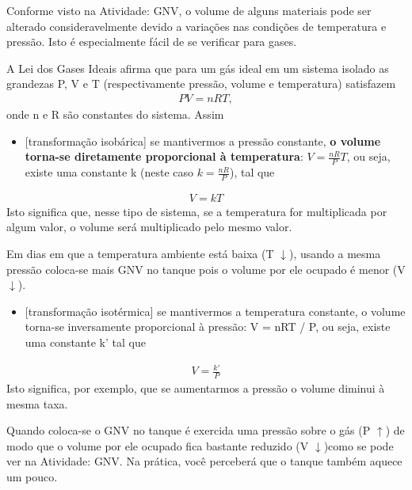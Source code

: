 \begin{reflection}{}

Conforme visto na Atividade: GNV, o volume de alguns materiais pode ser alterado consideravelmente devido a variações nas condições de temperatura e pressão. Isto é especialmente fácil de se verificar para gases.

A Lei dos Gases Ideais afirma que para um gás ideal em um sistema isolado as grandezas P, V e T (respectivamente pressão, volume e temperatura) satisfazem
\begin{equation*}
\begin{split}PV=nRT,\end{split}
\end{equation*}
onde n e R são constantes do sistema. Assim
\begin{itemize}
\item {} 
{[}transformação isobárica{]} se mantivermos a pressão constante, \textbf{o volume torna-se diretamente proporcional à temperatura}: \(V=\frac{nR}{P}T\), ou seja, existe uma constante k (neste caso \(k=\frac{nR}{P}\)), tal que

\end{itemize}
\begin{equation*}
\begin{split}V=kT\end{split}
\end{equation*}
Isto significa que, nesse tipo de sistema, se a temperatura for multiplicada por algum valor, o volume será multiplicado pelo mesmo valor.

Em dias em que a temperatura ambiente está baixa (T \(\downarrow\)), usando a mesma pressão coloca-se mais GNV no tanque pois o volume por ele ocupado é menor (V \(\downarrow\)).
\begin{itemize}
\item {} 
{[}transformação isotérmica{]} se mantivermos a temperatura constante, o volume torna-se inversamente proporcional à pressão: V = nRT / P, ou seja, existe uma constante k’ tal que

\end{itemize}
\begin{equation*}
\begin{split}V=\frac{k'}{P}\end{split}
\end{equation*}
Isto significa, por exemplo, que se aumentarmos a pressão o volume diminui à mesma taxa.

Quando coloca-se o GNV no tanque é exercida uma pressão sobre o gás (P \(\uparrow\)) de modo que o volume por ele ocupado fica bastante reduzido (V \(\downarrow\))como se pode ver na Atividade: GNV. Na prática, você perceberá que o tanque também aquece um pouco.


\end{reflection}

